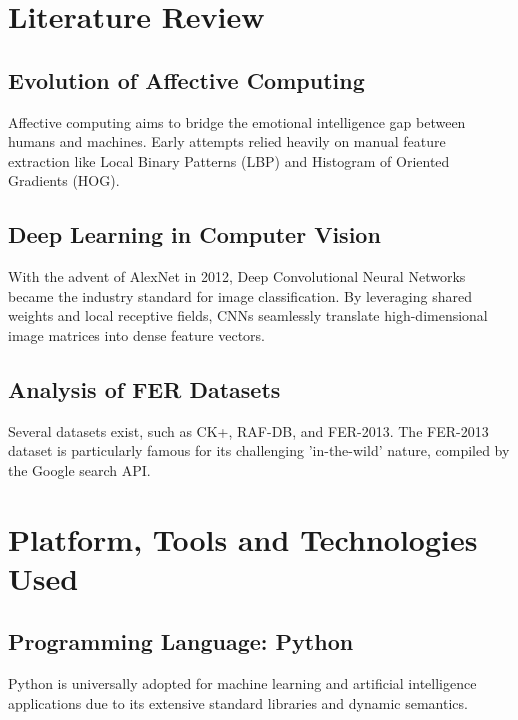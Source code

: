 \documentclass[12pt,a4paper]{report}
\begin{document}
\lipsum[15-18] %


\chapter{Literature Review}

\section{Evolution of Affective Computing}
Affective computing aims to bridge the emotional intelligence gap between humans and machines. Early attempts relied heavily on manual feature extraction like Local Binary Patterns (LBP) and Histogram of Oriented Gradients (HOG).

\lipsum[19-25] %

\section{Deep Learning in Computer Vision}
With the advent of AlexNet in 2012, Deep Convolutional Neural Networks became the industry standard for image classification. By leveraging shared weights and local receptive fields, CNNs seamlessly translate high-dimensional image matrices into dense feature vectors.

\lipsum[26-32] %

\section{Analysis of FER Datasets}
Several datasets exist, such as CK+, RAF-DB, and FER-2013. The FER-2013 dataset is particularly famous for its challenging 'in-the-wild' nature, compiled by the Google search API. 

\lipsum[33-40] %


\chapter{Platform, Tools and Technologies Used}

\section{Programming Language: Python}
Python is universally adopted for machine learning and artificial intelligence applications due to its extensive standard libraries and dynamic semantics.
\lipsum[41-43]
\end{document}
